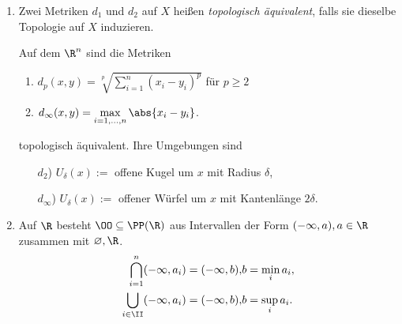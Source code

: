 \begin{bsp}
\begin{enumerate}[label=\arabic{*}.]
\begin{proof}
Für TOP 2 genügt es zu zeigen, dass der Durchschnitt zweier offener Mengen
wieder offen ist, denn seien $\bigcup\limits_\alpha
U_{\delta_\alpha}(x_\alpha),\;\bigcup\limits_\beta
U_{\delta_\beta}(x_\beta)$ zwei offene Mengen in $X$, dann gilt
\begin{align*}
\left(\bigcup\limits_\alpha U_{\delta_\alpha}(x_\alpha) \right) \cap \left(\bigcup\limits_\beta
U_{\delta_\beta}(x_\beta) \right)
 = \bigcap\limits_{\alpha,\beta} \left(\underbrace{U_{\delta_\alpha}(x_\alpha)
 \cup U_{\delta_\beta}(x_\beta)}_{\text{Vereinigung offener Kugeln}}
 \right).
\end{align*}
Sei nun $M = U_\delta(x)\cap U_\ep(z)$ mit $\delta, \ep >0,\;x,y\in X$ und
\begin{align*}
\rho_y = \min\{\delta - d(x,y),\ep - d(z,y)\},
\end{align*}
dann ist $U_{\rho_y}(y) \subseteq U_\delta(x)\cap U_\ep(z) = M$ und daher ist
$M = \bigcup\limits_{y\in M} U_{\rho_y}(y)$.\qedhere
\end{proof}
\item
\begin{defnn}
Zwei Metriken $d_1$ und $d_2$ auf $X$ heißen \emph{topologisch äquivalent},
falls sie dieselbe Topologie auf $X$ induzieren.\fishhere
\end{defnn}
Auf dem $\R^n$ sind die Metriken
\begin{enumerate}
  \item $d_p(x,y) = \sqrt[p]{ \sum\limits_{i=1}^n (x_i-y_i)^p}$ für $p\ge 2$
  \item $d_\infty(x,y) = \max\limits_{i=1,\ldots,n} \abs{x_i-y_i}$.
\end{enumerate}
topologisch äquivalent. Ihre Umgebungen sind
\begin{enumerate}
  \item[$d_2$)] $U_\delta(x) := $ offene Kugel um $x$ mit Radius $\delta$,
  \item[$d_\infty$)] $U_\delta(x) :=$ offener Würfel um $x$ mit Kantenlänge
  $2\delta$.
\end{enumerate}
\item
Auf $\R$ besteht $\OO\subseteq\PP(\R)$ aus Intervallen der Form
$(-\infty,a), a\in\R$ zusammen mit $\varnothing,\R$.
\begin{align*}
\bigcap\limits_{i=1}^n (-\infty,a_i) = (-\infty,b), & b = \min\limits_{i} a_i,\\
\bigcup\limits_{i\in \II} (-\infty,a_i) = (-\infty,b), & b = \sup\limits_i a_i.
\end{align*}


\end{enumerate}
\end{bsp}
